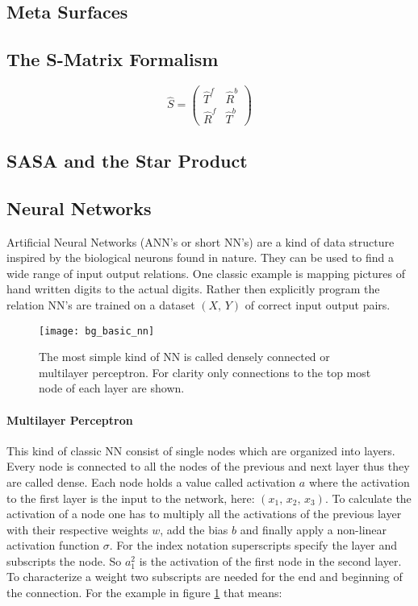 \subsection{Meta Surfaces}

\subsection{The S-Matrix Formalism}

\begin{equation}
    \hat{S} =
    \begin{pmatrix}
        \hat{T}^f & \hat{R}^b \\
        \hat{R}^f & \hat{T}^b
    \end{pmatrix}
\end{equation}


\subsection{SASA and the Star Product}


\subsection{Neural Networks}
Artificial Neural Networks (ANN's or short NN's) are a kind of data structure inspired by the biological neurons found in nature. They can be used to find a wide range of input output relations. One classic example is mapping pictures of hand written digits to the actual digits. Rather then explicitly program the relation NN's are trained on a dataset $(X, \, Y)$ of correct input output pairs.
\\


\begin{figure}[H]
    \centering
    \texttt{[image: bg\_basic\_nn]}
    \caption{The most simple kind of NN is called densely connected or multilayer perceptron. For clarity only connections to the top most node of each layer are shown.}
    \label{fig:bg:basic_nn}
\end{figure}

\paragraph{Multilayer Perceptron}
This kind of classic NN consist of single nodes which are organized into layers. Every node is connected to all the nodes of the previous and next layer thus they are called dense. Each node holds a value called activation $a$ where the activation to the first layer is the input to the network, here:
$(x_1, \, x_2, \, x_3)$.
To calculate the activation of a node one has to multiply all the activations of the previous layer with their respective weights $w$, add the bias $b$ and finally apply a non-linear activation function $\sigma$. For the index notation superscripts specify the layer and subscripts the node. So $a^2_1$ is the activation of the first node in the second layer. To characterize a weight two subscripts are needed for the end and beginning of the connection. For the example in figure \ref{fig:bg:basic_nn} that means:

